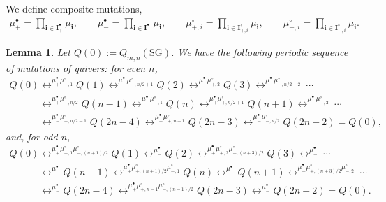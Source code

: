 \documentclass[pdftex]{sigma}
\numberwithin{equation}{section}
\newtheorem{Lemma}[Theorem]{Lemma}
\theoremstyle{definition}
\begin{document}
We def\/ine composite mutations,
\begin{gather}
\label{eq:mupm2m}
\mu_+^{\bullet}=\prod_{\mathbf{i}\in\mathbf{I}_+^{\bullet}}
\mu_{\mathbf{i}},
\qquad
\mu_-^{\bullet}=\prod_{\mathbf{i}\in\mathbf{I}_-^{\bullet}}
\mu_{\mathbf{i}},
\qquad
\mu_{+,i}^{\circ}=\prod_{\mathbf{i}\in\mathbf{I}_{+,i}^{\circ}}
\mu_{\mathbf{i}},
\qquad
\mu_{-,i}^{\circ}=\prod_{\mathbf{i}\in\mathbf{I}_{-,i}^{\circ}}
\mu_{\mathbf{i}}.
\end{gather}

\begin{Lemma}
\label{lem:GQmutm}
Let $Q(0):=Q_{m,n}(\mathrm{SG})$.
We have the following periodic sequence of mutations of quivers:
for even $n$,
\begin{gather}
Q(0)
\mathop{\longleftrightarrow}^{{\mu_+^{\bullet}} \mu_{+,1}^{\circ}}
 Q(1)
\mathop{\longleftrightarrow}^{\mu_-^{\bullet}\mu_{-,n/2+1}^{\circ}}
Q(2)
\mathop{\longleftrightarrow}^{\mu_+^{\bullet} \mu_{+,2}^{\circ}}
Q(3)
\mathop{\longleftrightarrow}^{\mu_-^{\bullet}\mu_{-,n/2+2}^{\circ}}
\ \cdots\
\nonumber\\
\phantom{Q(0)}{}
\mathop{\longleftrightarrow}^{\mu_+^{\bullet}\mu_{+,n/2}^{\circ}}
Q(n-1)
\mathop{\longleftrightarrow}^{{\mu_-^{\bullet}} \mu_{-,1}^{\circ}}
 Q(n)
\mathop{\longleftrightarrow}^{\mu_+^{\bullet}\mu_{+,n/2+1}^{\circ}}
 Q(n+1)
\mathop{\longleftrightarrow}^{\mu_-^{\bullet}\mu_{-,2}^{\circ}}
\ \cdots\
\nonumber\\
\phantom{Q(0)}{}
\mathop{\longleftrightarrow}^{\mu_-^{\bullet}\mu_{-,n/2-1}^{\circ}}
Q(2n-4)
\mathop{\longleftrightarrow}^{\mu_+^{\bullet}\mu_{+,n-1}^{\circ}}
Q(2n-3)
\mathop{\longleftrightarrow}^{\mu_-^{\bullet}\mu_{-,n/2}^{\circ}}
Q(2n-2)=Q(0),\label{eq:GB2m}
\end{gather}
and, for odd $n$,
\begin{gather}
Q(0)
\mathop{\longleftrightarrow}^{{\mu_+^{\bullet}} \mu_{+,1}^{\circ}
\mu_{-,(n+1)/2}^{\circ}}
 Q(1)
\mathop{\longleftrightarrow}^{\mu_-^{\bullet}}
Q(2)
\mathop{\longleftrightarrow}^{\mu_+^{\bullet} \mu_{+,2}^{\circ}
\mu_{-,(n+3)/2}^{\circ}}
Q(3)
\mathop{\longleftrightarrow}^{\mu_-^{\bullet}}
\ \cdots\
\nonumber\\
\phantom{Q(0)}{}
\mathop{\longleftrightarrow}^{\mu_-^{\bullet}}
Q(n-1)
\mathop{\longleftrightarrow}^{{\mu_+^{\bullet}}
\mu_{+,(n+1)/2}^{\circ} \mu_{-,1}^{\circ}
}
 Q(n)
\mathop{\longleftrightarrow}^{\mu_-^{\bullet}}
Q(n+1)
\mathop{\longleftrightarrow}^{{\mu_+^{\bullet}}
\mu_{+,(n+3)/2}^{\circ} \mu_{-,2}^{\circ}
}
\ \cdots
\nonumber\\
\phantom{Q(0)}{}
\mathop{\longleftrightarrow}^{\mu_-^{\bullet}}
Q(2n-4)
\mathop{\longleftrightarrow}^{\mu_+^{\bullet}\mu_{+,n-1}^{\circ}
\mu_{-,(n-1)/2}^{\circ}}
Q(2n-3)
\mathop{\longleftrightarrow}^{\mu_-^{\bullet}}
Q(2n-2)=Q(0).\label{eq:GB2mm}
\end{gather}
\end{Lemma}
\end{document}
